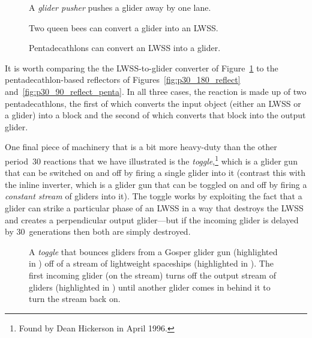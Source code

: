 \begin{figure}
	\centering
	\begin{minipage}{0.31\textwidth}
		\centering
		\caption{A \emph{glider pusher} pushes a glider away by one lane.}\label{fig:glider_pusher_main}
	\end{minipage}\quad
	\begin{minipage}{0.31\textwidth}
		\centering\vspace*{1.13cm}
		\caption{Two queen bees can convert a glider into an LWSS.}\label{fig:glider_to_lwss}
	\end{minipage}\quad
	\begin{minipage}{0.31\textwidth}
		\centering\vspace*{0.58cm}
		\caption{Pentadecathlons can convert an LWSS into a glider.}\label{fig:lwss_to_glider}
	\end{minipage}
\end{figure}

It is worth comparing the the LWSS-to-glider converter of Figure~\ref{fig:lwss_to_glider} to the pentadecathlon-based reflectors of Figures~\ref{fig:p30_180_reflect} and~\ref{fig:p30_90_reflect_penta}. In all three cases, the reaction is made up of two pentadecathlons, the first of which converts the input object (either an LWSS or a glider) into a block and the second of which converts that block into the output glider.

One final piece of machinery that is a bit more heavy-duty than the other period~$30$ reactions that we have illustrated is the \emph{toggle},\footnote{Found by Dean Hickerson in April 1996.} which is a glider gun that can be switched on and off by firing a single glider into it (contrast this with the inline inverter, which is a glider gun that can be toggled on and off by firing a \emph{constant stream} of gliders into it). The toggle works by exploiting the fact that a glider can strike a particular phase of an LWSS in a way that destroys the LWSS and creates a perpendicular output glider---but if the incoming glider is delayed by $30$~generations then both are simply destroyed.

\begin{figure}[!htb]
	\centering
	\caption{A \emph{toggle} that bounces gliders from a Gosper glider gun (highlighted in ) off of a stream of lightweight spaceships (highlighted in ). The first incoming glider (on the  stream) turns off the output stream of gliders (highlighted in ) until another glider comes in behind it to turn the stream back on.}
	\label{fig:toggle}
\end{figure}


